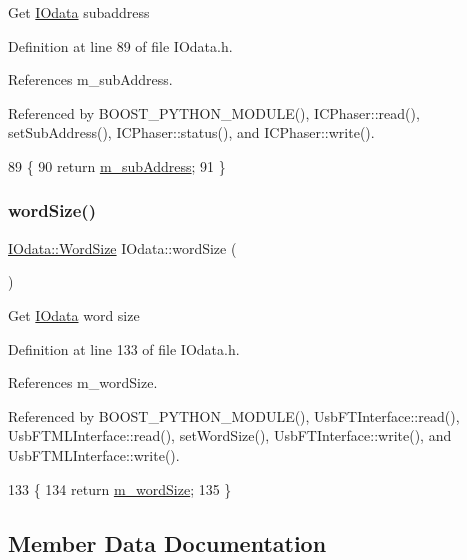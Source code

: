 Get \hyperlink{classIOdata}{I\+Odata} subaddress 

Definition at line 89 of file I\+Odata.\+h.



References m\+\_\+sub\+Address.



Referenced by B\+O\+O\+S\+T\+\_\+\+P\+Y\+T\+H\+O\+N\+\_\+\+M\+O\+D\+U\+L\+E(), I\+C\+Phaser\+::read(), set\+Sub\+Address(), I\+C\+Phaser\+::status(), and I\+C\+Phaser\+::write().


\begin{DoxyCode}
89                   \{
90     \textcolor{keywordflow}{return} \hyperlink{classIOdata_a562f84e5cace1e392f1b0fca553fff78}{m\_subAddress};
91   \}
\end{DoxyCode}
\mbox{\label{classIOdata_a91f9e8b4095ca8365a824e43be36b143}} 
\subsubsection{\texorpdfstring{word\+Size()}{wordSize()}}
{\footnotesize\ttfamily \hyperlink{classIOdata_a37c53ebf4bf8d866aac8af572962a84c}{I\+Odata\+::\+Word\+Size} I\+Odata\+::word\+Size (\begin{DoxyParamCaption}{ }\end{DoxyParamCaption})\hspace{0.3cm}{\ttfamily [inline]}}

Get \hyperlink{classIOdata}{I\+Odata} word size 

Definition at line 133 of file I\+Odata.\+h.



References m\+\_\+word\+Size.



Referenced by B\+O\+O\+S\+T\+\_\+\+P\+Y\+T\+H\+O\+N\+\_\+\+M\+O\+D\+U\+L\+E(), Usb\+F\+T\+Interface\+::read(), Usb\+F\+T\+M\+L\+Interface\+::read(), set\+Word\+Size(), Usb\+F\+T\+Interface\+::write(), and Usb\+F\+T\+M\+L\+Interface\+::write().


\begin{DoxyCode}
133                            \{
134     \textcolor{keywordflow}{return} \hyperlink{classIOdata_a719b0ce607ada4fa91b12d6ecfa1b4c9}{m\_wordSize};
135   \}
\end{DoxyCode}


\subsection{Member Data Documentation}
\mbox{\label{classIOdata_a965810e1888b904c575277f50cea734a}} 
